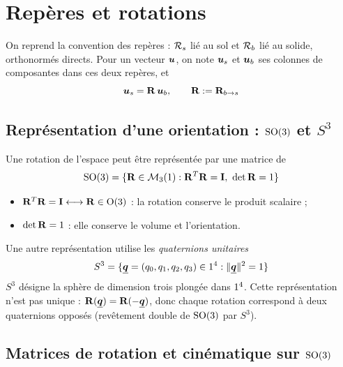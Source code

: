 
\section{Repères et rotations}

On reprend la convention des repères : $\mathcal{R}_{s}$ lié au sol et
$\mathcal{R}_{b}$ lié au solide, orthonormés directs. Pour un vecteur
$\bm{u}$, on note $\bm{u}_s$ et $\bm{u}_b$ ses colonnes de
composantes dans ces deux repères, et
\[
    \bm{u}_s = \mathbf{R}\,\bm{u}_b,
    \qquad \mathbf{R} := \mathbf{R}_{b\to s}
\]

\subsection{Représentation d'une orientation : \texorpdfstring{$\mathrm{SO}(3)$}{SO(3)}
et \texorpdfstring{$S^3$}{S3}}

Une rotation de l'espace peut être représentée par une matrice de
\[
    \mathrm{SO}(3) = \{\mathbf{R}\in\mathcal{M}_3(1) :
    \mathbf{R}^T\mathbf{R} = \mathbf{I},\ \det\mathbf{R} = 1\}
\]
\begin{itemize}
    \item $\mathbf{R}^T\mathbf{R} = \mathbf{I} \longleftrightarrow
        \mathbf{R}\in\mathrm{O}(3)$ : la rotation conserve le produit
        scalaire ;
    \item $\det\mathbf{R} = 1$ : elle conserve le volume et l'orientation.
\end{itemize}

Une autre représentation utilise les \emph{quaternions unitaires}
\[
    S^3 = \{\underline{\bm{q}} = (q_0,q_1,q_2,q_3)\in1^4 : \|\underline{\bm{q}}\|^2 = 1\}
\]
$S^3$ désigne la sphère de dimension trois plongée dans $1^4$. Cette
représentation n'est pas unique : $\mathbf{R}(\underline{\bm{q}})
= \mathbf{R}(-\underline{\bm{q}})$, donc chaque rotation correspond à deux
quaternions opposés (revêtement double de $\mathrm{SO}(3)$ par $S^3$).

\subsection{Matrices de rotation et cinématique sur \texorpdfstring{$\mathrm{SO}(3)$}{SO(3)}}

